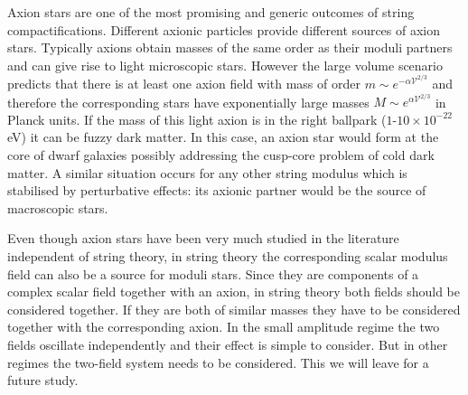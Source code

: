 \documentclass[11pt,a4paper]{article}
\begin{document}
Axion stars are one of the most promising and generic outcomes of string compactifications. Different axionic particles provide different sources of axion stars. Typically axions obtain masses of the same order as their moduli partners and can give rise to light microscopic stars. However the large volume scenario predicts that there is at least one axion field with mass of order $m\sim e^{-\alpha\mathcal{V}^{2/3}}$ and therefore the corresponding stars have exponentially large masses $M\sim e^{\alpha \mathcal{V}^{2/3}}$ in Planck units. If the mass of this light axion is in the right ballpark ($1\text{-}10 \times 10^{-22} \,$ eV) it can be fuzzy dark matter. In this case, an axion star would form at the core of dwarf galaxies possibly addressing the cusp-core problem of cold dark matter. A similar situation occurs for any other string modulus which is stabilised by perturbative effects: its axionic partner would be the source of macroscopic stars.

Even though axion stars have been very much studied in the  literature independent of string theory, in string theory the corresponding scalar modulus field can also be a source for moduli stars. Since they are components of a complex scalar field together with an axion, in string theory both fields should be considered together. If they are both of similar masses they have to be considered together with the corresponding axion. In the small amplitude regime the two fields oscillate independently and their effect is simple to consider. But in other regimes the two-field system needs to be considered. This we will leave for a future study.
\end{document}
